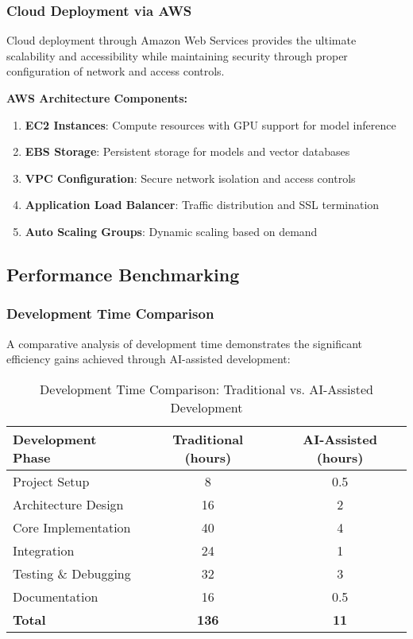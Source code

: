 \documentclass[12pt,letterpaper]{article}
\begin{document}
\subsubsection{Cloud Deployment via AWS}

Cloud deployment through Amazon Web Services provides the ultimate scalability and accessibility while maintaining security through proper configuration of network and access controls.

\textbf{AWS Architecture Components:}
\begin{enumerate}
    \item \textbf{EC2 Instances}: Compute resources with GPU support for model inference
    \item \textbf{EBS Storage}: Persistent storage for models and vector databases
    \item \textbf{VPC Configuration}: Secure network isolation and access controls
    \item \textbf{Application Load Balancer}: Traffic distribution and SSL termination
    \item \textbf{Auto Scaling Groups}: Dynamic scaling based on demand
\end{enumerate}

\subsection{Performance Benchmarking}

\subsubsection{Development Time Comparison}

A comparative analysis of development time demonstrates the significant efficiency gains achieved through AI-assisted development:

\begin{table}[H]
\centering
\caption{Development Time Comparison: Traditional vs. AI-Assisted Development}
\label{tab:dev_time_comparison}
\begin{tabular}{|l|c|c|}
\hline
\textbf{Development Phase} & \textbf{Traditional (hours)} & \textbf{AI-Assisted (hours)} \\
\hline
Project Setup & 8 & 0.5 \\
Architecture Design & 16 & 2 \\
Core Implementation & 40 & 4 \\
Integration & 24 & 1 \\
Testing \& Debugging & 32 & 3 \\
Documentation & 16 & 0.5 \\
\hline
\textbf{Total} & \textbf{136} & \textbf{11} \\
\hline
\end{tabular}
\end{table}
\end{document}
